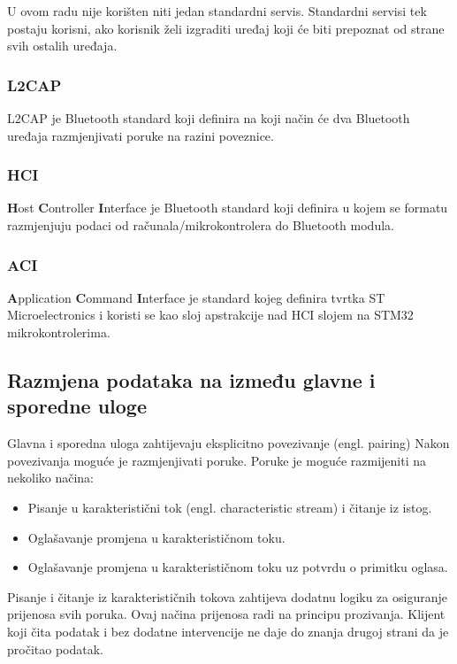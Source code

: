 \documentclass[times, utf8, diplomski]{diplomski}
\begin{document}
U ovom radu nije korišten niti jedan standardni servis. Standardni servisi tek postaju korisni, ako korisnik želi izgraditi uređaj koji će biti prepoznat od strane svih ostalih uređaja.

\subsubsection{L2CAP}
L2CAP je Bluetooth standard koji definira na koji način će dva Bluetooth uređaja razmjenjivati poruke na razini poveznice.

\subsubsection{HCI}
\textbf{H}ost \textbf{C}ontroller \textbf{I}nterface je Bluetooth standard koji definira u kojem se formatu razmjenjuju podaci od računala/mikrokontrolera do Bluetooth modula.

\subsubsection{ACI}
\textbf{A}pplication \textbf{C}ommand \textbf{I}nterface je standard kojeg definira tvrtka ST Microelectronics i koristi se kao sloj apstrakcije nad HCI slojem na STM32 mikrokontrolerima.


\subsection {Razmjena podataka na između glavne i sporedne uloge}
Glavna i sporedna uloga zahtijevaju eksplicitno povezivanje (engl. pairing) Nakon povezivanja moguće je razmjenjivati poruke. Poruke je moguće razmijeniti na nekoliko načina:

\begin{itemize}
  \item Pisanje u karakteristični tok (engl. characteristic stream) i čitanje iz istog.
  \item Oglašavanje promjena u karakterističnom toku.
  \item Oglašavanje promjena u karakterističnom toku uz potvrdu o primitku oglasa.
\end{itemize}

Pisanje i čitanje iz karakterističnih tokova zahtijeva dodatnu logiku za osiguranje prijenosa svih poruka. Ovaj načina prijenosa radi na principu prozivanja. Klijent koji čita podatak i bez dodatne intervencije ne daje do znanja drugoj strani da je pročitao podatak.
\end{document}
